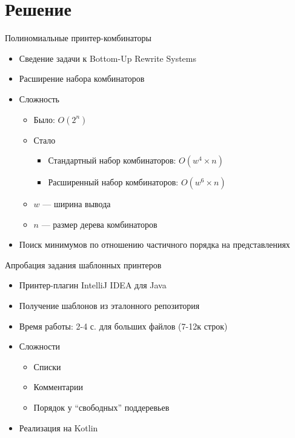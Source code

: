 \documentclass[sans]{beamer}
\begin{document}
\section{Решение}

\begin{frame}{Полиномиальные принтер-комбинаторы}
  \begin{itemize}
    \item Сведение задачи к Bottom-Up Rewrite Systems
    \item Расширение набора комбинаторов
    \item Сложность
      \begin{itemize}
        \item Было: $O(2^n)$
        \item Стало
          \begin{itemize}
            \item Стандартный набор комбинаторов: $O(w ^ 4 \times n)$
            \item Расширенный набор комбинаторов: $O(w ^ 6 \times n)$
          \end{itemize}
      \item $w$ --- ширина вывода
      \item $n$ --- размер дерева комбинаторов
      \end{itemize}
    \item Поиск минимумов по отношению частичного порядка на представлениях
  \end{itemize}
\end{frame}

\begin{frame}{Апробация задания шаблонных принтеров}
  \begin{itemize}
    \item Принтер-плагин IntelliJ IDEA для Java
    \item Получение шаблонов из эталонного репозитория
    \item Время работы: 2-4 с. для больших файлов (7-12к строк)
    \item Сложности
      \begin{itemize}
        \item Списки
        \item Комментарии
        \item Порядок у ``свободных'' поддеревьев
      \end{itemize}
    \item Реализация на Kotlin
  \end{itemize}
\end{frame}
\end{document}
